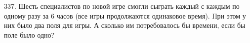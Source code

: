 337. Шесть специалистов по новой игре смогли сыграть каждый с каждым по одному разу за 6 часов (все игры продолжаются одинаковое время). При этом у них было два поля для игры. А сколько им потребовалось бы времени, если бы поле было одно?\\
